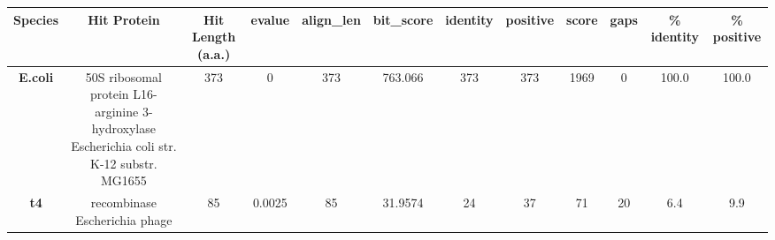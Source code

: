 \begin{tabular}{|c|c|c|c|c|c|c|c|c|c|c|c|} \hline
\textbf{Species} & \textbf{Hit Protein} & \textbf{Hit Length (a.a.)} & \textbf{evalue} & \textbf{align\_len} & \textbf{bit\_score} & \textbf{identity} & \textbf{positive} & \textbf{score} & \textbf{gaps} & \textbf{\% identity} & \textbf{\% positive} \\ \hline
\textbf{E.coli} & 50S ribosomal protein L16-arginine 3-hydroxylase Escherichia coli str. K-12 substr. MG1655 & 373 & 0 & 373 & 763.066 & 373 & 373 & 1969 & 0 & 100.0 & 100.0\\
\textbf{t4} & recombinase Escherichia phage  & 85 & 0.0025 & 85 & 31.9574 & 24 & 37 & 71 & 20 & 6.4 & 9.9\\
\hline \end{tabular}
